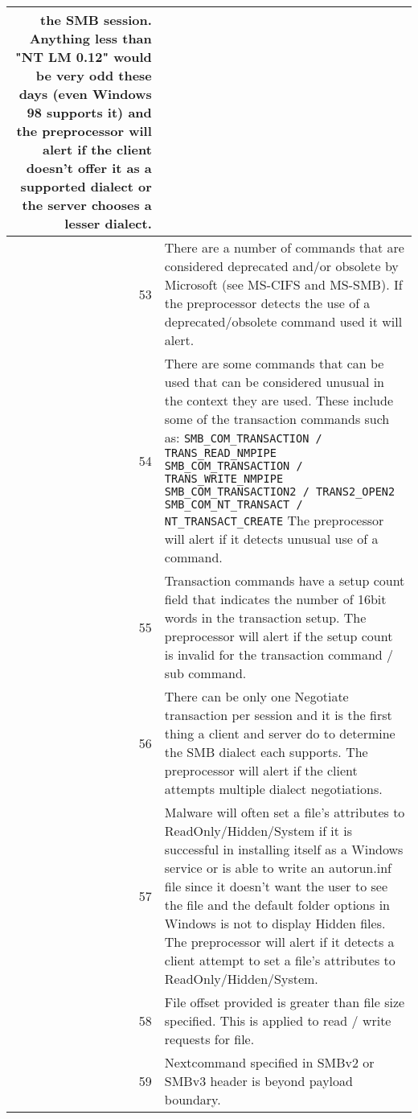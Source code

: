\documentclass[english]{report}
\begin{document}
\begin{itemize}
\begin{longtable}{|r|p{13.5cm}|}
      the SMB session.  Anything less than "NT LM 0.12" would be very odd
      these days (even Windows 98 supports it) and the preprocessor will
      alert if the client doesn't offer it as a supported dialect or the
      server chooses a lesser dialect.\\
\hline
 53 & There are a number of commands that are considered deprecated and/or
       obsolete by Microsoft (see MS-CIFS and MS-SMB).  If the preprocessor
       detects the use of a deprecated/obsolete command used it will alert.\\
\hline
 54 & There are some commands that can be used that can be considered unusual
      in the context they are used.  These include some of the transaction
      commands such as:
      \texttt{SMB\_COM\_TRANSACTION / TRANS\_READ\_NMPIPE}
      \texttt{SMB\_COM\_TRANSACTION / TRANS\_WRITE\_NMPIPE}
      \texttt{SMB\_COM\_TRANSACTION2 / TRANS2\_OPEN2}
      \texttt{SMB\_COM\_NT\_TRANSACT / NT\_TRANSACT\_CREATE}
      The preprocessor will alert if it detects unusual use of a command.\\
\hline
 55 & Transaction commands have a setup count field that indicates the
      number of 16bit words in the transaction setup.  The preprocessor
      will alert if the setup count is invalid for the transaction
      command / sub command.\\
\hline
 56 & There can be only one Negotiate transaction per session and it is the
      first thing a client and server do to determine the SMB dialect each
      supports.  The preprocessor will alert if the client attempts multiple
      dialect negotiations.\\
\hline
 57 & Malware will often set a file's attributes to ReadOnly/Hidden/System if
      it is successful in installing itself as a Windows service or is able to
      write an autorun.inf file since it doesn't want the user to see the file
      and the default folder options in Windows is not to display Hidden files.
      The preprocessor will alert if it detects a client attempt to set a
      file's attributes to ReadOnly/Hidden/System.\\
\hline
 58 & File offset provided is greater than file size specified. This is applied
      to read / write requests for file.\\
\hline
 59 & Nextcommand specified in SMBv2 or SMBv3 header is beyond payload boundary.\\
\hline
\end{longtable}
\end{itemize}
\end{document}
